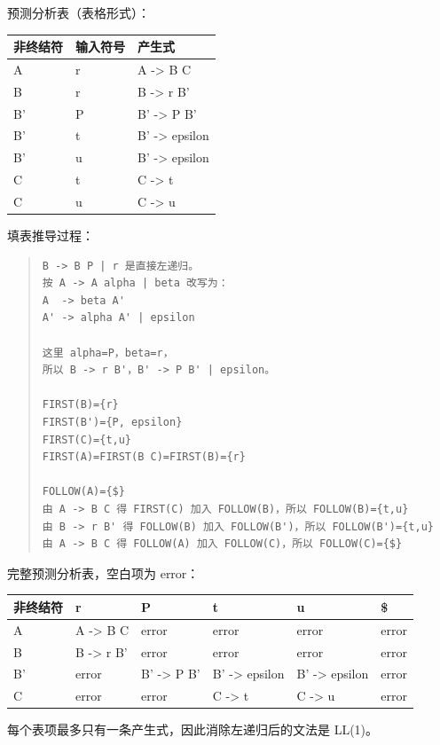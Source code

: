\documentclass[UTF8,zihao=-4]{ctexart}
\begin{document}
预测分析表（表格形式）：

\begin{center}
\footnotesize
\begin{tabular}{lll}
\hline
非终结符 & 输入符号 & 产生式 \\
\hline
A & r & A -> B C \\
B & r & B -> r B' \\
B' & P & B' -> P B' \\
B' & t & B' -> epsilon \\
B' & u & B' -> epsilon \\
C & t & C -> t \\
C & u & C -> u \\
\hline
\end{tabular}
\end{center}

填表推导过程：

\begin{quote}
\footnotesize
\begin{verbatim}
B -> B P | r 是直接左递归。
按 A -> A alpha | beta 改写为：
A  -> beta A'
A' -> alpha A' | epsilon

这里 alpha=P，beta=r，
所以 B -> r B'，B' -> P B' | epsilon。

FIRST(B)={r}
FIRST(B')={P, epsilon}
FIRST(C)={t,u}
FIRST(A)=FIRST(B C)=FIRST(B)={r}

FOLLOW(A)={$}
由 A -> B C 得 FIRST(C) 加入 FOLLOW(B)，所以 FOLLOW(B)={t,u}
由 B -> r B' 得 FOLLOW(B) 加入 FOLLOW(B')，所以 FOLLOW(B')={t,u}
由 A -> B C 得 FOLLOW(A) 加入 FOLLOW(C)，所以 FOLLOW(C)={$}
\end{verbatim}
\end{quote}

完整预测分析表，空白项为 error：

\begin{center}
\footnotesize
\begin{tabular}{llllll}
\hline
非终结符 & r & P & t & u & \$ \\
\hline
A & A -> B C & error & error & error & error \\
B & B -> r B' & error & error & error & error \\
B' & error & B' -> P B' & B' -> epsilon & B' -> epsilon & error \\
C & error & error & C -> t & C -> u & error \\
\hline
\end{tabular}
\end{center}

每个表项最多只有一条产生式，因此消除左递归后的文法是 LL(1)。
\end{document}
